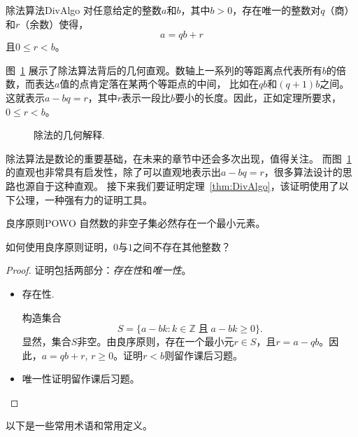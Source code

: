 \begin{theorem}{除法算法}{DivAlgo}
对任意给定的整数$a$和$b$，其中$b > 0$，存在唯一的整数对$q$（商）和$r$（余数）使得，
	\[a = qb + r\]
且$0 \leq r < b$。
\end{theorem}

图~\ref{fig:division} 展示了除法算法背后的几何直观。数轴上一系列的等距离点代表所有$b$的倍数，而表达$a$值的点肯定落在某两个等距点的中间，
比如在$qb$和$(q+1)b$之间。这就表示$a - bq = r$，其中$r$表示一段比$b$要小的长度。因此，正如定理所要求，$0 \leq r < b$。

\begin{figure}
\begin{center}

\caption{除法的几何解释.}
\label{fig:division}
\end{center}
\end{figure}

除法算法是数论的重要基础，在未来的章节中还会多次出现，值得关注。
而图~\ref{fig:division}的直观也非常具有启发性，除了可以直观地表示出$a - bq = r$，很多算法设计的思路也源自于这种直观。
接下来我们要证明定理~\ref{thm:DivAlgo}，该证明使用了以下公理，一种强有力的证明工具。
\begin{axiom}{良序原则}{POWO}
自然数的非空子集必然存在一个最小元素。 
\end{axiom}

\begin{thinking}
	如何使用良序原则证明，$0$与$1$之间不存在其他整数？
\end{thinking}

\begin{proof}
 证明包括两部分：\emph{存在性}和\emph{唯一性}。

\begin{itemize}
\item 存在性.

构造集合
	 \[S = \{ a - bk : k \in \mathbb{Z} \; \text{且}\; a - bk \geq 0 \}.\]
	 显然，集合$S$非空。由良序原则，存在一个最小元$r \in S$，且$r = a - qb$。因此，$a = qb + r$, $r \geq 0$。证明$r < b$则留作课后习题。

\item 唯一性证明留作课后习题。
\end{itemize}
\end{proof}

以下是一些常用术语和常用定义。

